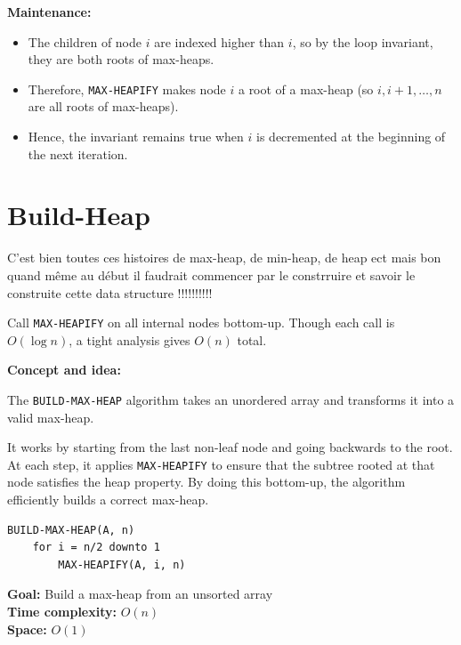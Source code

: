 \documentclass[11pt,a4paper,openany]{book}
\begin{document}
\textbf{Maintenance:}
\begin{itemize}
    \item The children of node $i$ are indexed higher than $i$, so by the loop invariant, they are both roots of max-heaps.
    \item Therefore, \texttt{MAX-HEAPIFY} makes node $i$ a root of a max-heap (so $i, i + 1, \ldots, n$ are all roots of max-heaps).
    \item Hence, the invariant remains true when $i$ is decremented at the beginning of the next iteration.
\end{itemize}




\vspace{2cm}




\section{Build-Heap}
C'est bien toutes ces histoires de max-heap, de min-heap, de heap ect mais
bon quand même au début il faudrait commencer par le constrruire et savoir 
le construite cette data structure !!!!!!!!!!

Call \texttt{MAX-HEAPIFY} on all internal nodes bottom-up.
Though each call is $O(\log n)$, a tight analysis gives $O(n)$ total.

\textbf{Concept and idea:}

The \texttt{BUILD-MAX-HEAP} algorithm takes an unordered array and transforms it into a valid max-heap.

It works by starting from the last non-leaf node and going backwards to the root.  
At each step, it applies \texttt{MAX-HEAPIFY} to ensure that the subtree rooted at that node satisfies the heap property.  
By doing this bottom-up, the algorithm efficiently builds a correct max-heap.

\begin{lstlisting}
BUILD-MAX-HEAP(A, n)
    for i = n/2 downto 1
        MAX-HEAPIFY(A, i, n)
\end{lstlisting}

\textbf{Goal:} Build a max-heap from an unsorted array \\
\textbf{Time complexity:} $O(n)$ \\
\textbf{Space:} $O(1)$








\vspace{2cm}
\end{document}
